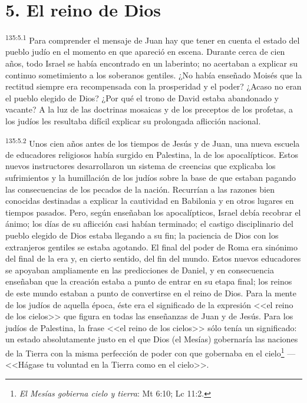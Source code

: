 \section*{5. El reino de Dios}
\par 
\textsuperscript{135:5.1} Para comprender el mensaje de Juan hay que tener en cuenta el estado del pueblo judío en el momento en que apareció en escena. Durante cerca de cien años, todo Israel se había encontrado en un laberinto; no acertaban a explicar su continuo sometimiento a los soberanos gentiles. ¿No había enseñado Moisés que la rectitud siempre era recompensada con la prosperidad y el poder? ¿Acaso no eran el pueblo elegido de Dios? ¿Por qué el trono de David estaba abandonado y vacante? A la luz de las doctrinas mosaicas y de los preceptos de los profetas, a los judíos les resultaba difícil explicar su prolongada aflicción nacional.

\par 
\textsuperscript{135:5.2} Unos cien años antes de los tiempos de Jesús y de Juan, una nueva escuela de educadores religiosos había surgido en Palestina, la de los apocalípticos. Estos nuevos instructores desarrollaron un sistema de creencias que explicaba los sufrimientos y la humillación de los judíos sobre la base de que estaban pagando las consecuencias de los pecados de la nación. Recurrían a las razones bien conocidas destinadas a explicar la cautividad en Babilonia y en otros lugares en tiempos pasados. Pero, según enseñaban los apocalípticos, Israel debía recobrar el ánimo; los días de su aflicción casi habían terminado; el castigo disciplinario del pueblo elegido de Dios estaba llegando a su fin; la paciencia de Dios con los extranjeros gentiles se estaba agotando. El final del poder de Roma era sinónimo del final de la era y, en cierto sentido, del fin del mundo. Estos nuevos educadores se apoyaban ampliamente en las predicciones de Daniel, y en consecuencia enseñaban que la creación estaba a punto de entrar en su etapa final; los reinos de este mundo estaban a punto de convertirse en el reino de Dios. Para la mente de los judíos de aquella época, éste era el significado de la expresión <<el reino de los cielos>> que figura en todas las enseñanzas de Juan y de Jesús. Para los judíos de Palestina, la frase <<el reino de los cielos>> sólo tenía un significado: un estado absolutamente justo en el que Dios (el Mesías) gobernaría las naciones de la Tierra con la misma perfección de poder con que gobernaba en el cielo\footnote{\textit{El Mesías gobierna cielo y tierra}: Mt 6:10; Lc 11:2.} ---<<Hágase tu voluntad en la Tierra como en el cielo>>.


